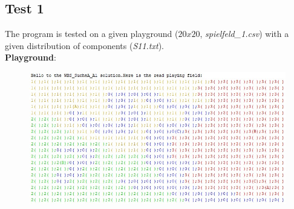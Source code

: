 \documentclass{article}
\begin{document}
\subsection{Test 1}
The program is tested on a given playground ($20 x 20$, \textit{spielfeld\_1.csv}) with a given distribution of components (\textit{S11.txt}).\\
\textbf{Playground}:\\
\begin{figure}[H]
\includegraphics[width=14cm]{playgroundtest1.jpeg}
\centering
\end{figure}
\end{document}

